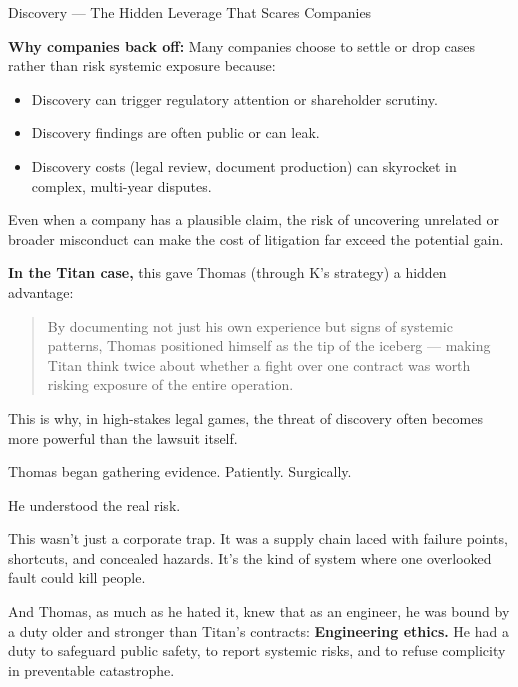 \begin{HistoricalSidebar}{Discovery --- The Hidden Leverage That Scares Companies}
    \medskip
    
    \textbf{Why companies back off:} Many companies choose to settle or drop cases rather than risk systemic exposure because:

    \medskip

    \begin{itemize}
        \item Discovery can trigger regulatory attention or shareholder scrutiny.
        \item Discovery findings are often public or can leak.
        \item Discovery costs (legal review, document production) can skyrocket in complex, multi-year disputes.
    \end{itemize}

    \medskip
    
    Even when a company has a plausible claim, the risk of uncovering unrelated or broader misconduct can make the cost of litigation far exceed the potential gain.
    
    \medskip
    
    \textbf{In the Titan case,} this gave Thomas (through K’s strategy) a hidden advantage:

    \medskip

    \begin{quote}
        By documenting not just his own experience but signs of systemic patterns,  
        Thomas positioned himself as the tip of the iceberg —  
        making Titan think twice about whether a fight over one contract was worth risking exposure of the entire operation.
    \end{quote}
    
    This is why, in high-stakes legal games, the threat of discovery often becomes more powerful than the lawsuit itself.
    
\end{HistoricalSidebar}

\medskip

Thomas began gathering evidence.
Patiently.
Surgically.

He understood the real risk.

This wasn’t just a corporate trap.
It was a supply chain laced with failure points, shortcuts, and concealed hazards.
It's the kind of system where one overlooked fault could kill people.

And Thomas, as much as he hated it, knew that as an engineer, he was bound by a duty older and stronger than Titan’s contracts: \textbf{Engineering ethics.} 
He had a duty to safeguard public safety, to report systemic risks, and to refuse complicity in preventable catastrophe.

